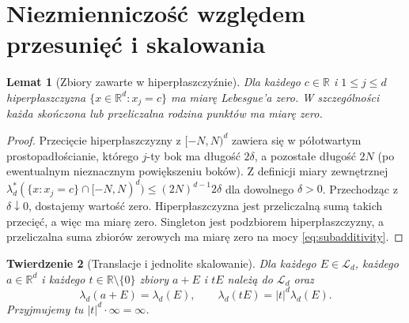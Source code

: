 \documentclass[11pt,a4paper,oneside]{book}
\numberwithin{equation}{chapter}
\theoremstyle{plain}
\newtheorem{twierdzenie}{Twierdzenie}[chapter]
\newtheorem{lemat}[twierdzenie]{Lemat}
\theoremstyle{definition}
\theoremstyle{remark}
\begin{document}
\section{Niezmienniczość względem przesunięć i skalowania}

\begin{lemat}[Zbiory zawarte w hiperpłaszczyźnie]
\label{lem:hyperplane-null}
Dla każdego $c\in\mathbb R$ i $1\le j\le d$
hiperpłaszczyzna $\{x\in\mathbb R^d:x_j=c\}$ ma
miarę Lebesgue'a zero. W szczególności każda skończona
lub przeliczalna rodzina punktów ma miarę zero.
\end{lemat}

\begin{proof}
Przecięcie hiperpłaszczyzny z $[-N,N)^d$ zawiera się
w półotwartym prostopadłościanie, którego $j$-ty bok
ma długość $2\delta$, a pozostałe długość $2N$
(po ewentualnym nieznacznym powiększeniu boków).
Z definicji miary zewnętrznej
$\lambda_d^*(\{x:x_j=c\}\cap[-N,N)^d)
\le (2N)^{d-1}2\delta$ dla dowolnego $\delta>0$.
Przechodząc z $\delta\downarrow0$, dostajemy wartość zero.
Hiperpłaszczyzna jest przeliczalną sumą takich przecięć,
a więc ma miarę zero. Singleton jest podzbiorem
hiperpłaszczyzny, a przeliczalna suma zbiorów zerowych
ma miarę zero na mocy \eqref{eq:subadditivity}.
\end{proof}

\begin{twierdzenie}[Translacje i jednolite skalowanie]
\label{thm:invariance-lebesgue}
Dla każdego $E\in\mathcal L_d$, każdego
$a\in\mathbb R^d$ i każdego $t\in\mathbb R\setminus\{0\}$
zbiory $a+E$ i $tE$ należą do $\mathcal L_d$ oraz
\begin{equation}\label{eq:lebesgue-invariance}
\lambda_d(a+E)=\lambda_d(E),\qquad
\lambda_d(tE)=|t|^d\lambda_d(E).
\end{equation}
Przyjmujemy tu $|t|^d\cdot\infty=\infty$.
\end{twierdzenie}
\end{document}
